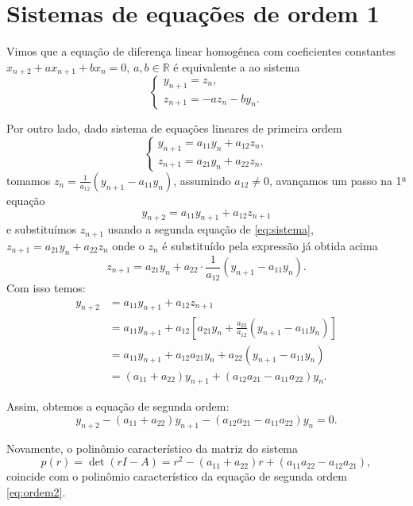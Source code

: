 \documentclass{article}
\begin{document}
\section{Sistemas de equações de ordem 1}

Vimos que a equação de diferença linear homogênea com coeficientes
constantes $x_{n+2} + a x_{n+1} + b x_n = 0$,
\( a, b \in \mathbb{R} \) é equivalente a 
ao  sistema
\begin{equation}
\begin{cases}
y_{n+1} = z_n, \\
z_{n+1} = -a z_n - b y_n.
\end{cases}
\end{equation}

Por outro lado, dado sistema de equações lineares  de primeira ordem
\begin{equation}
\label{eq:sistema}
\begin{cases}
y_{n+1} = a_{11} y_n + a_{12} z_n, \\
z_{n+1} = a_{21} y_n + a_{22} z_n,
\end{cases}
\end{equation}
tomamos \( z_n = \frac{1}{a_{12}} (y_{n+1} - a_{11} y_n)\), assumindo
$a_{12} \neq 0$, avançamos um passo na 1ª equação
\[
y_{n+2} = a_{11} y_{n+1} + a_{12} z_{n+1}
\]
e substituímos \( z_{n+1} \) usando a segunda equação de
\eqref{eq:sistema}, $z_{n+1} = a_{21} y_n + a_{22} z_n$ onde o $z_n$ é
substituído pela expressão já obtida acima
\[
z_{n+1} = a_{21} y_n + a_{22} \cdot \frac{1}{a_{12}} (y_{n+1} - a_{11} y_n).
\]
Com isso temos:
\begin{align*}
y_{n+2} &= a_{11} y_{n+1} + a_{12} z_{n+1} \\
&= a_{11} y_{n+1} + a_{12} \left[ a_{21} y_n + \frac{a_{22}}{a_{12}} (y_{n+1} - a_{11} y_n) \right] \\
&= a_{11} y_{n+1} + a_{12} a_{21} y_n + a_{22} (y_{n+1} - a_{11} y_n) \\
&= (a_{11} + a_{22}) y_{n+1} + (a_{12} a_{21} - a_{11} a_{22}) y_n.
\end{align*}

Assim, obtemos a equação de segunda ordem:
\begin{equation}
\label{eq:ordem2}
y_{n+2} - (a_{11} + a_{22}) y_{n+1} - (a_{12} a_{21} - a_{11} a_{22}) y_n = 0.
\end{equation}

Novamente, o polinômio característico da matriz do sistema
\[
p(r) = \det(r I - A) = r^2 - (a_{11} + a_{22}) r + (a_{11} a_{22} - a_{12} a_{21}),
\]
coincide com o polinômio característico da equação de segunda ordem \eqref{eq:ordem2}.
\end{document}
